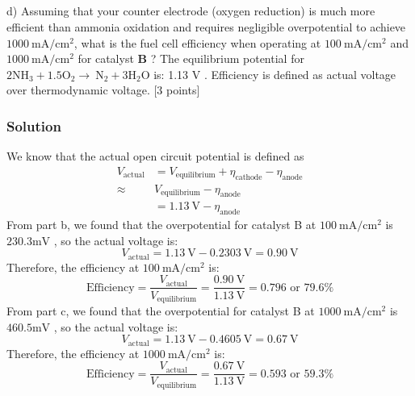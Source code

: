 \documentclass[12pt]{article}
\begin{document}
\subsection{}
d) Assuming that your counter electrode (oxygen reduction) is much more efficient than ammonia oxidation and requires negligible overpotential to achieve $1000 \mathrm{~mA} / \mathrm{cm}^{2}$, what is the fuel cell efficiency when operating at $100 \mathrm{~mA} / \mathrm{cm}^{2}$ and $1000 \mathrm{~mA} / \mathrm{cm}^{2}$ for catalyst $\mathbf{B}$ ? The equilibrium potential for $2 \mathrm{NH}_{3}+1.5 \mathrm{O}_{2} \rightarrow \mathrm{~N}_{2}+3 \mathrm{H}_{2} \mathrm{O}$ is: 1.13 V . Efficiency is defined as actual voltage over thermodynamic voltage. [3 points]\\
\subsubsection{Solution}
We know that the actual open circuit potential is defined as
\begin{align}
V_{\text{actual}}&=V_{\text{equilibrium}}+\eta_{\text{cathode}}-\eta_{\text{anode}} \\
\approx & V_{\text{equilibrium}}-\eta_{\text{anode}} \\
&=1.13 \mathrm{~V}-\eta_{\text{anode}}
\end{align}
From part b, we found that the overpotential for catalyst B at $100 \mathrm{~mA} / \mathrm{cm}^{2}$ is $230.3 \mathrm{mV}$ , so the actual voltage is:
\begin{equation}
V_{\text{actual}}=1.13 \mathrm{~V}-0.2303 \mathrm{~V}=0.90 \mathrm{~V}
\end{equation}
Therefore, the efficiency at $100 \mathrm{~mA} / \mathrm{cm}^{2}$ is:
\begin{equation}
\text{Efficiency}=\frac{V_{\text{actual}}}{V_{\text{equilibrium}}}=\frac{0.90 \mathrm{~V}}{1.13 \mathrm{~V}}=0.796 \text{ or } 79.6 \%
\end{equation}
From part c, we found that the overpotential for catalyst B at $1000 \mathrm{~mA} / \mathrm{cm}^{2}$ is $460.5 \mathrm{mV}$ , so the actual voltage is:
\begin{equation}
V_{\text{actual}}=1.13 \mathrm{~V}-0.4605 \mathrm{~V}=0.67 \mathrm{~V}
\end{equation}
Therefore, the efficiency at $1000 \mathrm{~mA} / \mathrm{cm}^{2}$ is:
\begin{equation}
\text{Efficiency}=\frac{V_{\text{actual}}}{V_{\text{equilibrium}}}=\frac{0.67 \mathrm{~V}}{1.13 \mathrm{~V}}=0.593 \text{ or } 59.3 \%
\end{equation}
\end{document}
